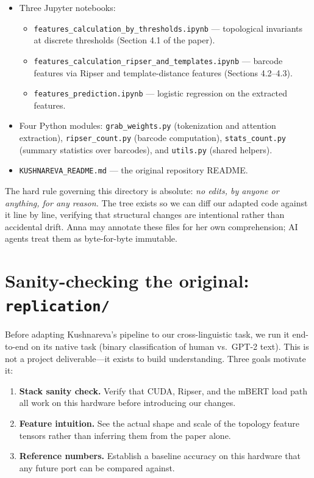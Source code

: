\begin{itemize}
  \item Three Jupyter notebooks:
    \begin{itemize}
      \item \texttt{features\_calculation\_by\_thresholds.ipynb} --- topological invariants at discrete thresholds (Section 4.1 of the paper).
      \item \texttt{features\_calculation\_ripser\_and\_templates.ipynb} --- barcode features via Ripser and template-distance features (Sections 4.2--4.3).
      \item \texttt{features\_prediction.ipynb} --- logistic regression on the extracted features.
    \end{itemize}
  \item Four Python modules: \texttt{grab\_weights.py} (tokenization and attention extraction), \texttt{ripser\_count.py} (barcode computation), \texttt{stats\_count.py} (summary statistics over barcodes), and \texttt{utils.py} (shared helpers).
  \item \texttt{KUSHNAREVA\_README.md} --- the original repository README.
\end{itemize}

The hard rule governing this directory is absolute: \emph{no edits, by anyone or anything, for any reason.} The tree exists so we can diff our adapted code against it line by line, verifying that structural changes are intentional rather than accidental drift. Anna may annotate these files for her own comprehension; AI agents treat them as byte-for-byte immutable.

\section{Sanity-checking the original: \texttt{replication/}}
\label{sec:replication}

Before adapting Kushnareva's pipeline to our cross-linguistic task, we run it end-to-end on its native task (binary classification of human vs.\ GPT-2 text). This is not a project deliverable---it exists to build understanding. Three goals motivate it:

\begin{enumerate}
  \item \textbf{Stack sanity check.} Verify that CUDA, Ripser, and the mBERT load path all work on this hardware before introducing our changes.
  \item \textbf{Feature intuition.} See the actual shape and scale of the topology feature tensors rather than inferring them from the paper alone.
  \item \textbf{Reference numbers.} Establish a baseline accuracy on this hardware that any future port can be compared against.
\end{enumerate}

